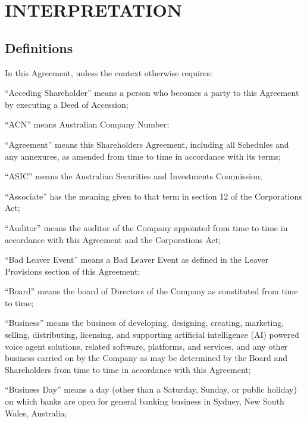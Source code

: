 \section{INTERPRETATION}

\subsection{Definitions}
In this Agreement, unless the context otherwise requires:

``Acceding Shareholder'' means a person who becomes a party to this Agreement by executing a Deed of Accession;

``ACN'' means Australian Company Number;

``Agreement'' means this Shareholders Agreement, including all Schedules and any annexures, as amended from time to time in accordance with its terms;

``ASIC'' means the Australian Securities and Investments Commission;

``Associate'' has the meaning given to that term in section 12 of the Corporations Act;

``Auditor'' means the auditor of the Company appointed from time to time in accordance with this Agreement and the Corporations Act;

``Bad Leaver Event'' means a Bad Leaver Event as defined in the Leaver Provisions section of this Agreement;

``Board'' means the board of Directors of the Company as constituted from time to time;

``Business'' means the business of developing, designing, creating, marketing, selling, distributing, licensing, and supporting artificial intelligence (AI) powered voice agent solutions, related software, platforms, and services, and any other business carried on by the Company as may be determined by the Board and Shareholders from time to time in accordance with this Agreement;

``Business Day'' means a day (other than a Saturday, Sunday, or public holiday) on which banks are open for general banking business in Sydney, New South Wales, Australia;

